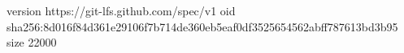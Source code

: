 version https://git-lfs.github.com/spec/v1
oid sha256:8d016f84d361e29106f7b714de360eb5eaf0df3525654562abff787613bd3b95
size 22000
